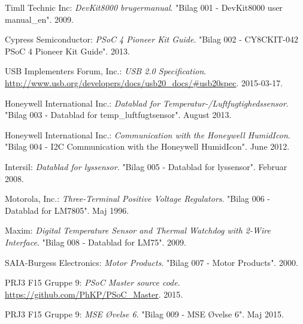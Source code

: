 \renewcommand{\bibname}{Litteraturliste}
\begin{thebibliography}{2}

 Timll Technic Inc: \textit{DevKit8000 brugermanual}. "Bilag 001 - DevKit8000 user manual\_en". 2009.

 Cypress Semiconductor: \textit{PSoC 4 Pioneer Kit Guide}. "Bilag 002 - CY8CKIT-042 PSoC 4 Pioneer Kit Guide". 2013.

 USB Implementers Forum, Inc.: \textit{USB 2.0 Specification}. \url{http://www.usb.org/developers/docs/usb20_docs/#usb20spec}. 2015-03-17.

 Honeywell International Inc.: \textit{Datablad for Temperatur-/Luftfugtighedssensor}. "Bilag 003 - Datablad for temp\_luftfugtsensor". August 2013.

 Honeywell International Inc.: \textit{\IIC Communication with the Honeywell HumidIcon}. "Bilag 004 - I2C Communication with the Honeywell HumidIcon". June 2012.

 Intersil: \textit{Datablad for lyssensor}. "Bilag 005 - Datablad for lyssensor". Februar 2008.

 Motorola, Inc.: \textit{Three-Terminal Positive Voltage Regulators}. "Bilag 006 - Datablad for LM7805". Maj 1996.

 Maxim: \textit{Digital Temperature Sensor and Thermal
Watchdog with 2-Wire Interface}. "Bilag 008 - Datablad for LM75". 2009.

 SAIA-Burgess Electronics: \textit{Motor Products}. "Bilag 007 - Motor Products". 2000.

 PRJ3 F15 Gruppe 9: \textit{PSoC Master source code}. \url{https://github.com/PhKP/PSoC_Master}. 2015.

 PRJ3 F15 Gruppe 9: \textit{MSE Øvelse 6}. "Bilag 009 - MSE Øvelse 6". Maj 2015. %

\end{thebibliography}